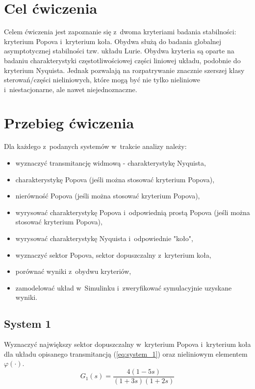 \documentclass{sprawozdanie-agh}
\begin{document}

\stronatytulowa{}
\section{Cel ćwiczenia}
Celem ćwiczenia jest zapoznanie się z~dwoma kryteriami badania stabilności: kryterium Popova i~kryterium koła.
Obydwa służą do badania globalnej asymptotycznej stabilności tzw. układu Lurie.
Obydwa kryteria są oparte na badaniu charakterystyki częstotliwościowej części liniowej układu, podobnie do kryterium Nyquista.
Jednak pozwalają na rozpatrywanie znacznie szerszej klasy sterowań/części nieliniowych, które mogą być nie tylko nieliniowe i~niestacjonarne, ale nawet niejednoznaczne.

\section{Przebieg ćwiczenia}
Dla każdego z~podanych systemów w~trakcie analizy należy:
\begin{itemize}
    \item wyznaczyć transmitancję widmową - charakterystykę Nyquista,
    \item charakterystykę Popova (jeśli można stosować kryterium Popova),
    \item nierówność Popova (jeśli można stosować kryterium Popova),
    \item wyrysować charakterystykę Popova i~odpowiednią prostą Popova (jeśli można stosować kryterium Popova),
    \item wyrysować charakterystykę Nyquista i~odpowiednie "koło",
    \item wyznaczyć sektor Popova, sektor dopuszczalny z~kryterium koła,
    \item porównać wyniki z~obydwu kryteriów,
    \item zamodelować układ w~Simulinku i~zweryfikować symulacyjnie uzyskane wyniki. 
\end{itemize}

    \subsection{System 1}
    Wyznaczyć największy sektor dopuszczalny w~kryterium Popova i~kryterium koła dla układu opisanego transmitancją (\ref{eq:system_1}) oraz nieliniowym elementem $\varphi(\cdot)$.%
    \begin{equation}
        \label{eq:system_1}
        G_{1}(s) = \frac{4(1-5s)}{(1+3s)(1+2s)}
    \end{equation}
\end{document}

